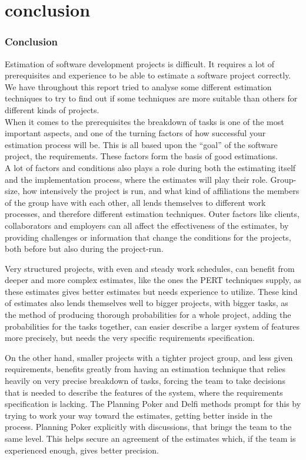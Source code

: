 \part{conclusion}
\section{Conclusion}
Estimation of software development projects is difficult. It requires a lot of prerequisites and experience to
be able to estimate a software project correctly. We have throughout this report tried to analyse some different
estimation techniques to try to find out if some techniques are more suitable than others for different kinds of
projects.\\

When it comes to the prerequisites the breakdown of tasks is one of the most important aspects, and one of the turning factors of how successful your estimation process will be. This is all based upon the ``goal'' of the software project, the requirements. These factors form the basis of good estimations.\\

A lot of factors and conditions also plays a role during both the estimating itself and the implementation process, where the estimates will play their role. Group-size, how intensively the project is run, and what kind of affiliations the members of the group have with each other, all lends themselves to different work processes, and therefore different estimation techniques. Outer factors like clients, collaborators and employers can all affect the effectiveness of the estimates, by providing challenges or information that change the conditions for the projects, both before but also during the project-run. 

Very structured projects, with even and steady work schedules, can benefit from deeper and more complex estimates, like the ones the PERT techniques supply, as these estimates gives better estimates but needs experience to utilize. These kind of estimates also lends themselves well to bigger projects, with bigger tasks, as the method of producing thorough probabilities for a whole project, adding the probabilities for the tasks together, can easier describe a larger system of features more precisely, but needs the very specific requirements specification.

On the other hand, smaller projects with a tighter project group, and less given requirements, benefits greatly from having an estimation technique that relies heavily on very precise breakdown of tasks, forcing the team to take decisions that is needed to describe the features of the system, where the requirements specification is lacking. The Planning Poker and Delfi methods prompt for this by trying to work your way toward the estimates, getting better inside in the process. Planning Poker explicitly with discussions, that brings the team to the same level. This helps secure an agreement of the estimates which, if the team is experienced enough, gives better precision.

